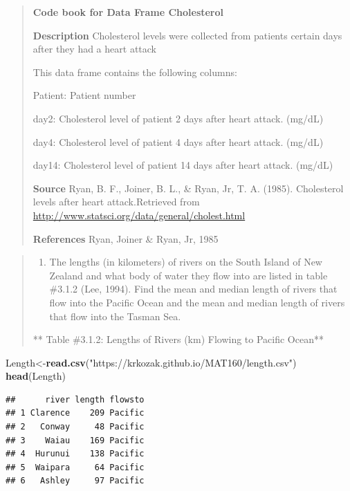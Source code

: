 \documentclass[]{book}
\newenvironment{Shaded}{\begin{snugshade}}{\end{snugshade}}
\newcommand{\KeywordTok}[1]{\textcolor[rgb]{0.13,0.29,0.53}{\textbf{#1}}}
\newcommand{\NormalTok}[1]{#1}
\newcommand{\StringTok}[1]{\textcolor[rgb]{0.31,0.60,0.02}{#1}}
\providecommand{\tightlist}{%
  \setlength{\itemsep}{0pt}\setlength{\parskip}{0pt}}
\begin{document}
\begin{quote}
\textbf{Code book for Data Frame Cholesterol}

\textbf{Description}
Cholesterol levels were collected from patients certain days after they had a heart attack

This data frame contains the following columns:

Patient: Patient number

day2: Cholesterol level of patient 2 days after heart attack. (mg/dL)

day4: Cholesterol level of patient 4 days after heart attack. (mg/dL)

day14: Cholesterol level of patient 14 days after heart attack. (mg/dL)

\textbf{Source}
Ryan, B. F., Joiner, B. L., \& Ryan, Jr, T. A. (1985). Cholesterol levels after heart attack.Retrieved from \url{http://www.statsci.org/data/general/cholest.html}

\textbf{References}
Ryan, Joiner \& Ryan, Jr, 1985
\end{quote}

\begin{quote}
\begin{enumerate}
\def\labelenumi{\arabic{enumi}.}
\setcounter{enumi}{1}
\tightlist
\item
  The lengths (in kilometers) of rivers on the South Island of New Zealand and what body of water they flow into are listed in table \#3.1.2 (Lee, 1994). Find the mean and median length of rivers that flow into the Pacific Ocean and the mean and median length of rivers that flow into the Tasman Sea.
\end{enumerate}

** Table \#3.1.2: Lengths of Rivers (km) Flowing to Pacific Ocean**
\end{quote}

\begin{Shaded}
\begin{Highlighting}[]
\NormalTok{Length<-}\KeywordTok{read.csv}\NormalTok{(}\StringTok{"https://krkozak.github.io/MAT160/length.csv"}\NormalTok{)}
\KeywordTok{head}\NormalTok{(Length)}
\end{Highlighting}
\end{Shaded}

\begin{verbatim}
##      river length flowsto
## 1 Clarence    209 Pacific
## 2   Conway     48 Pacific
## 3    Waiau    169 Pacific
## 4  Hurunui    138 Pacific
## 5  Waipara     64 Pacific
## 6   Ashley     97 Pacific
\end{verbatim}
\end{document}
